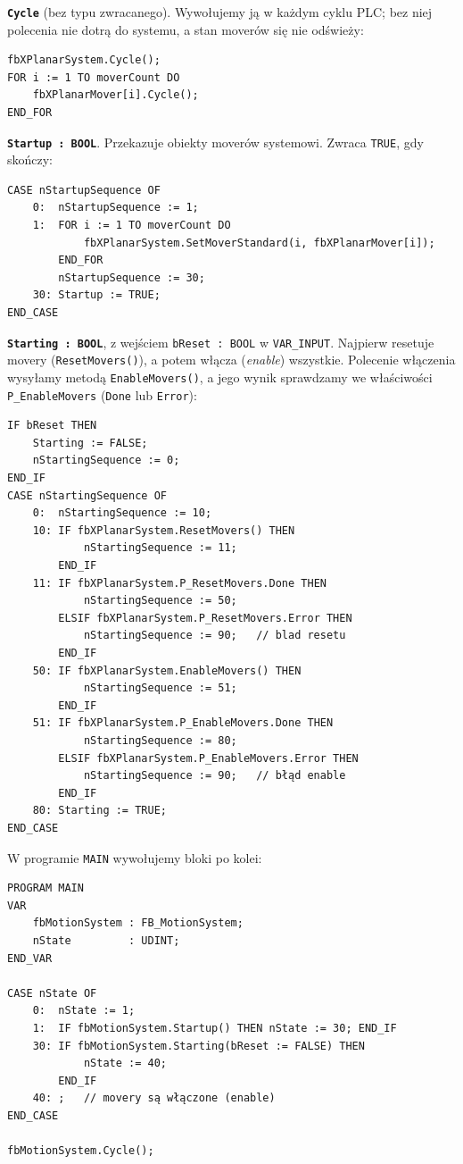 \documentclass[11pt,a4paper]{report}
\begin{document}
\textbf{\texttt{Cycle}} (bez typu zwracanego). Wywołujemy ją w każdym cyklu PLC; bez niej polecenia nie dotrą do systemu, a stan moverów się nie odświeży:
{\footnotesize
\begin{verbatim}
fbXPlanarSystem.Cycle();
FOR i := 1 TO moverCount DO
    fbXPlanarMover[i].Cycle();
END_FOR
\end{verbatim}}
\textbf{\texttt{Startup : BOOL}}. Przekazuje obiekty moverów systemowi. Zwraca \texttt{TRUE}, gdy skończy:
{\footnotesize
\begin{verbatim}
CASE nStartupSequence OF
    0:  nStartupSequence := 1;
    1:  FOR i := 1 TO moverCount DO
            fbXPlanarSystem.SetMoverStandard(i, fbXPlanarMover[i]);
        END_FOR
        nStartupSequence := 30;
    30: Startup := TRUE;
END_CASE
\end{verbatim}}
\textbf{\texttt{Starting : BOOL}}, z wejściem \texttt{bReset : BOOL} w \texttt{VAR\_INPUT}. Najpierw resetuje movery (\texttt{ResetMovers()}), a potem włącza (\textit{enable}) wszystkie. Polecenie włączenia wysyłamy metodą \texttt{EnableMovers()}, a jego wynik sprawdzamy we właściwości \texttt{P\_EnableMovers} (\texttt{Done} lub \texttt{Error}):
{\footnotesize
\begin{verbatim}
IF bReset THEN
    Starting := FALSE;
    nStartingSequence := 0;
END_IF
CASE nStartingSequence OF
    0:  nStartingSequence := 10;
    10: IF fbXPlanarSystem.ResetMovers() THEN
            nStartingSequence := 11;
        END_IF
    11: IF fbXPlanarSystem.P_ResetMovers.Done THEN
            nStartingSequence := 50;
        ELSIF fbXPlanarSystem.P_ResetMovers.Error THEN
            nStartingSequence := 90;   // blad resetu
        END_IF
    50: IF fbXPlanarSystem.EnableMovers() THEN
            nStartingSequence := 51;
        END_IF
    51: IF fbXPlanarSystem.P_EnableMovers.Done THEN
            nStartingSequence := 80;
        ELSIF fbXPlanarSystem.P_EnableMovers.Error THEN
            nStartingSequence := 90;   // błąd enable
        END_IF
    80: Starting := TRUE;
END_CASE
\end{verbatim}}
W programie \texttt{MAIN} wywołujemy bloki po kolei:
{\footnotesize
\begin{verbatim}
PROGRAM MAIN
VAR
    fbMotionSystem : FB_MotionSystem;
    nState         : UDINT;
END_VAR

CASE nState OF
    0:  nState := 1;
    1:  IF fbMotionSystem.Startup() THEN nState := 30; END_IF
    30: IF fbMotionSystem.Starting(bReset := FALSE) THEN
            nState := 40;
        END_IF
    40: ;   // movery są włączone (enable)
END_CASE

fbMotionSystem.Cycle();
\end{verbatim}}
\end{document}
